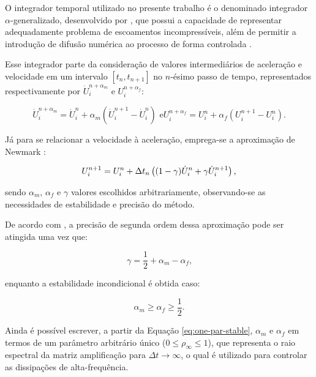 O integrador temporal utilizado no presente trabalho é o denominado integrador $\alpha$-generalizado, desenvolvido por , que possui a capacidade de representar adequadamente problema de escoamentos incompressíveis, além de permitir a introdução de difusão numérica ao processo de forma controlada \cite{fernandes2020tecnica}.

Esse integrador parte da consideração de valores intermediários de aceleração e velocidade em um intervalo $[t_n,t_{n+1}]$ no $n$-ésimo passo de tempo, representados respectivamente por $\dot{U}_i^{n+\alpha_m}$ e $U_i^{n+\alpha_f}$:

\begin{subequations}
    \begin{equation}
        \dot{U}_i^{n+\alpha_m}=\dot{U}_i^n+\alpha_m(\dot{U}_i^{n+1}-\dot{U}_i^n)\text{ e}
    \end{equation}
    \begin{equation}
        U_i^{n+\alpha_f}=U_i^n+\alpha_f(U_i^{n+1}-U_i^n)\text{.}
    \end{equation}
\end{subequations}

Já para se relacionar a velocidade à aceleração, emprega-se a aproximação de Newmark \cite{bazilevs2013computational}:

\begin{equation}
    U_i^{n+1}=U_i^n+\Delta t_n\left({(1-\gamma)\dot{U}_i^n+\gamma\dot{U}_i^{n+1}}\right)\text{,}
\end{equation}

\noindent sendo $\alpha_m$, $\alpha_f$ e $\gamma$ valores escolhidos arbitrariamente, observando-se as necessidades de estabilidade e precisão do método.

De acordo com , a precisão de segunda ordem dessa aproximação pode ser atingida uma vez que:

\begin{equation}
    \gamma=\frac{1}{2}+\alpha_m-\alpha_f\text{,}
\end{equation}

\noindent enquanto a estabilidade incondicional é obtida caso:

\begin{equation}
    \alpha_m\geq\alpha_f\geq\frac{1}{2}\text{.}
\end{equation}

Ainda é possível escrever, a partir da Equação \eqref{eq:one-par-stable}, $\alpha_m$ e $\alpha_f$ em termos de um parâmetro arbitrário único  ($0\leq\rho_\infty\leq1$), que representa o raio espectral da matriz amplificação para $\Delta t\to\infty$, o qual é utilizado para controlar as dissipações de alta-frequência.

